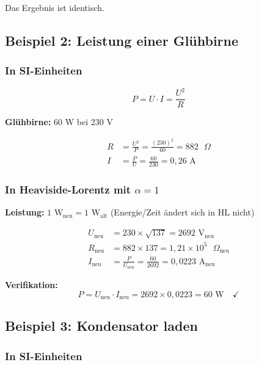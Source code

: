 	Das Ergebnis ist identisch.
	
	\subsection{Beispiel 2: Leistung einer Glühbirne}
	
	\subsubsection{In SI-Einheiten}
	
	\begin{equation}
		P = U \cdot I = \frac{U^2}{R}
	\end{equation}
	
	\textbf{Glühbirne:} 60 W bei 230 V
	
	\begin{align}
		R &= \frac{U^2}{P} = \frac{(230)^2}{60} = 882 \text{ }\Omega \\
		I &= \frac{P}{U} = \frac{60}{230} = 0{,}26 \text{ A}
	\end{align}
	
	\subsubsection{In Heaviside-Lorentz mit $\alpha = 1$}
	
	\textbf{Leistung:} $1 \text{ W}_{\text{neu}} = 1 \text{ W}_{\text{alt}}$ (Energie/Zeit ändert sich in HL nicht)
	
	\begin{align}
		U_{\text{neu}} &= 230 \times \sqrt{137} = 2692 \text{ V}_{\text{neu}} \\
		R_{\text{neu}} &= 882 \times 137 = 1{,}21 \times 10^{5} \text{ }\Omega_{\text{neu}} \\
		I_{\text{neu}} &= \frac{P}{U_{\text{neu}}} = \frac{60}{2692} = 0{,}0223 \text{ A}_{\text{neu}}
	\end{align}
	
	\textbf{Verifikation:}
	\begin{equation}
		P = U_{\text{neu}} \cdot I_{\text{neu}} = 2692 \times 0{,}0223 = 60 \text{ W} \quad \checkmark
	\end{equation}
	
	\subsection{Beispiel 3: Kondensator laden}
	
	\subsubsection{In SI-Einheiten}
	
